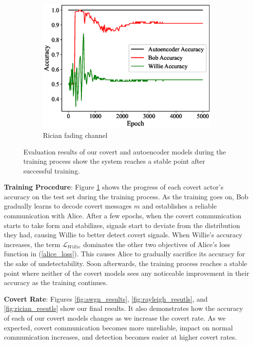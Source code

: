 \begin{figure}[tp!]
\begin{subfigure}{0.24\textwidth}
	\includegraphics[width=\linewidth]{figs/training_progress_rician}
	\caption{Rician fading channel}	
	\end{subfigure}
	\caption{Evaluation results of our covert and autoencoder models during the training process show the system reaches a stable point after successful training.}
	\label{fig:traning_progress}
\end{figure}


\textbf{Training Procedure}: Figure \ref{fig:traning_progress} shows the progress of each covert actor's accuracy on the test set during the training process. As the training goes on, Bob gradually learns to decode covert messages \(m\) and establishes a reliable communication with Alice. After a few epochs, when the covert communication starts to take form and stabilizes, signals start to deviate from the distribution they had, causing Willie to better detect covert signals. When Willie's accuracy increases, the term \(\mathcal{L}_{Willie}\) dominates the other two objectives of Alice's loss function in (\ref{alice_loss}). This causes Alice to gradually sacrifice its accuracy for the sake of undetectability. Soon afterwards, the training process reaches a stable point where neither of the covert models sees any noticeable improvement in their accuracy as the training continues. 


\textbf{Covert Rate}: Figures \ref{fig:awgn_results}, \ref{fig:rayleigh_resutls}, and \ref{fig:rician_resutls} show our final results. It also demonstrates how the accuracy of each of our covert models changes as we increase the covert rate. As we expected, covert communication becomes more unreliable, impact on normal communication increases, and detection becomes easier at higher covert rates.


